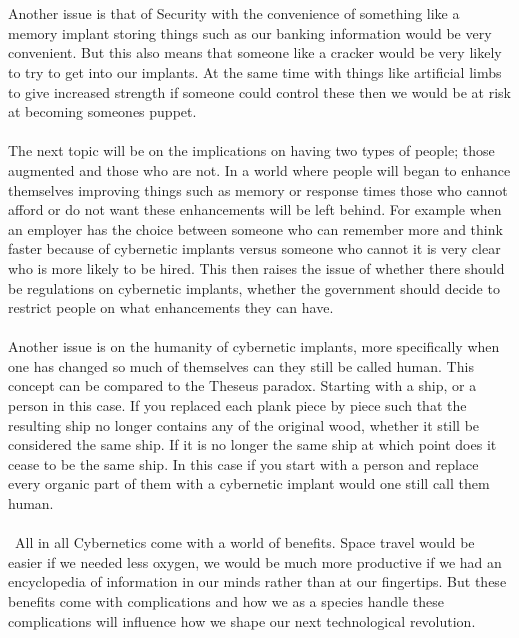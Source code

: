 \documentclass[12pt,a4paper,notitlepage]{article}
\begin{document}
\\\\
    Another issue is that of Security with the convenience of something like a
memory implant storing things such as our banking information would be very
convenient. But this also means that someone like a cracker would be very likely
to try to get into our implants. At the same time with things like artificial
limbs to give increased strength if someone could control these then we would be
at risk at becoming someones puppet.
\\\\
    The next topic will be on the implications on having two types of people;
those augmented and those who are not. In a world where people will began to
enhance themselves improving things such as memory or response times those who
cannot afford or do not want these enhancements will be left behind. For
example when an employer has the choice between someone who can remember more 
and think faster because of cybernetic implants versus someone who cannot it is
very clear who is more likely to be hired. This then raises the issue of whether
there should be regulations on cybernetic implants, whether the government
should decide to restrict people on what enhancements they can have. 
\\\\
    Another issue is on the humanity of cybernetic implants, more specifically
when one has changed so much of themselves can they still be called human. This
concept can be compared to the Theseus paradox. Starting with a ship, or a
person in this case. If you replaced each plank piece by piece such that the
resulting ship no longer contains any of the original wood, whether it still be
considered the same ship. If it is no longer the same ship at which point does
it cease to be the same ship. In this case if you start with a person and
replace every organic part of them with a cybernetic implant would one still
call them human.
\\\\\
    All in all Cybernetics come with a world of benefits. Space travel would be
easier if we needed less oxygen, we would be much more productive if we had an
encyclopedia of information in our minds rather than at our fingertips. But
these benefits come with complications and how we as a species handle these
complications will influence how we shape our next technological revolution.
\newpage
\end{document}
